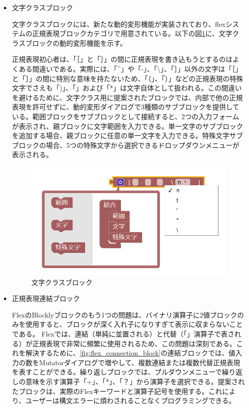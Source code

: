 \documentclass{risepaper}
\begin{document}
\begin{itemize}
\item 文字クラスブロック

文字クラスブロックには、新たな動的変形機能が実装されており、flexシステムの正規表現ブロックカテゴリで用意されている。以下の図\ref{fig:character_class_block}に、文字クラスブロックの動的変形機能を示す。

正規表現初心者は、「［」と「］」の間に正規表現を書き込もうとするのはよくある間違いである。実際には、「\textasciicircum」や「-」、「\textbackslash 」、「］」以外の文字は「［」と「］」の間に特別な意味を持たないため、「（」、「）」などの正規表現の特殊文字でさえも「)」、「\textbar」および「*」は文字自体として扱われる。この間違いを避けるために、文字クラス用に提案されたブロックでは、内部で他の正規表現を許可せずに、動的変形ダイアログで3種類のサブブロックを提供している。範囲ブロックをサブブロックとして接続すると、2つの入力フォームが表示され、親ブロックに文字範囲を入力できる。単一文字のサブブロックを追加する場合、親ブロックに任意の単一文字を入力できる。特殊文字サブブロックの場合、5つの特殊文字から選択できるドロップダウンメニューが表示される。

\begin{figure}[h]
\begin{center}
\includegraphics[scale=0.8]{img/character_class_block.png}
\caption{文字クラスブロック}%
\label{fig:character_class_block}
\end{center}%
\end{figure}%

\item 正規表現連結ブロック

FlexのBlocklyブロックのもう1つの問題は、バイナリ演算子に2値ブロックのみを使用すると、ブロックが深く入れ子になりすぎて表示に収まらないことである。 Flexでは、連結（単純に並置される）と代替（「\textbar」演算子で表される）が正規表現で非常に頻繁に使用されるため、この問題は深刻である。これを解決するために、\ref{fig:flex_connection_block}の連結ブロックでは、値入力の数をMutatorダイアログで増やして、複数連結または複数代替正規表現を表すことができる。繰り返しブロックでは、プルダウンメニューで繰り返しの意味を示す演算子「+」、「*」、「？」から演算子を選択できる。提案されたブロックは、実際のFlexキーワードと演算子記号を使用する。これにより、ユーザーは構文エラーに煩わされることなくプログラミングできる。


\end{itemize}
\end{document}
